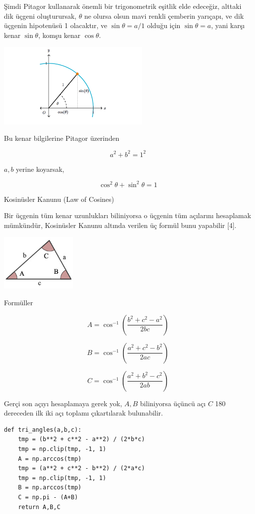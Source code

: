 \documentclass[12pt,fleqn]{article}\usepackage{../../common}
\begin{document}
Şimdi Pitagor kullanarak önemli bir trigonometrik eşitlik elde edeceğiz, alttaki
dik üçgeni oluşturursak, $\theta$ ne olursa olsun mavi renkli çemberin yarıçapı,
ve dik üçgenin hipotenüsü 1 olacaktır, ve $\sin\theta = a / 1$ olduğu için
$\sin\theta = a$, yani karşı kenar $\sin\theta$, komşu kenar $\cos\theta$.

\includegraphics[width=20em]{ode_mattuck_50_trig_02.png}

Bu kenar bilgilerine Pitagor üzerinden

$$
a^2 + b^2 = 1^2 
$$

$a,b$ yerine koyarsak,

$$
\cos^2\theta + \sin^2\theta = 1
$$

Kosinüsler Kanunu (Law of Cosines)

Bir üçgenin tüm kenar uzunlukları biliniyorsa o üçgenin tüm açılarını
hesaplamak mümkündür, Kosinüsler Kanunu altında verilen üç formül
bunu yapabilir [4].

\includegraphics[width=10em]{triangle-base.jpg}

Formüller

$$
A = \cos^{-1} \left( \frac{b^2 + c^2 - a^2}{2bc}  \right)
$$

$$
B = \cos^{-1} \left( \frac{a^2 + c^2 - b^2}{2ac}  \right)
$$

$$
C = \cos^{-1} \left( \frac{a^2 + b^2 - c^2}{2ab}  \right)
$$

Gerçi son açıyı hesaplamaya gerek yok, $A,B$ biliniyorsa üçüncü açı $C$ 180
dereceden ilk iki açı toplamı çıkartılarak bulunabilir.

\begin{verbatim}
def tri_angles(a,b,c):
    tmp = (b**2 + c**2 - a**2) / (2*b*c)
    tmp = np.clip(tmp, -1, 1)
    A = np.arccos(tmp)
    tmp = (a**2 + c**2 - b**2) / (2*a*c)
    tmp = np.clip(tmp, -1, 1)
    B = np.arccos(tmp)
    C = np.pi - (A+B)
    return A,B,C
\end{verbatim}
\end{document}
